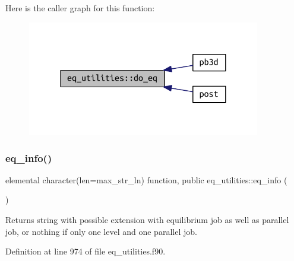 Here is the caller graph for this function\+:\nopagebreak
\begin{figure}[H]
\begin{center}
\leavevmode
\includegraphics[width=288pt]{namespaceeq__utilities_a5109472305101af3a15e8e8717c426fd_icgraph}
\end{center}
\end{figure}
\mbox{\label{namespaceeq__utilities_a34c5ddab45a54a6c738e5e0b8c7d55d6}} 
\subsubsection{\texorpdfstring{eq\+\_\+info()}{eq\_info()}}
{\footnotesize\ttfamily elemental character(len=max\+\_\+str\+\_\+ln) function, public eq\+\_\+utilities\+::eq\+\_\+info (\begin{DoxyParamCaption}{ }\end{DoxyParamCaption})}



Returns string with possible extension with equilibrium job as well as parallel job, or nothing if only one level and one parallel job. 



Definition at line 974 of file eq\+\_\+utilities.\+f90.

